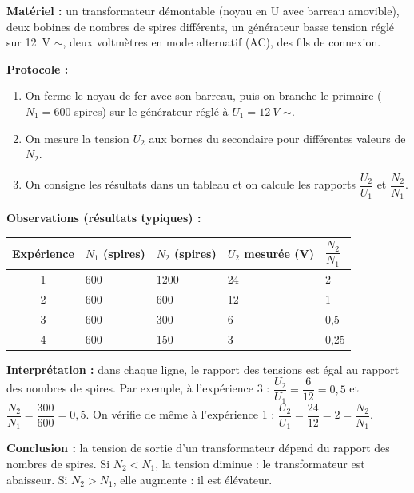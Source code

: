 \documentclass[11pt]{article}
\newcommand{\cle}[1]{{\popxbold\color{popdark}#1}}
\begin{document}
\begin{experience}
\textbf{Matériel :} un transformateur démontable (noyau en U avec barreau amovible), deux bobines de nombres de spires différents, un générateur basse tension réglé sur \SI{12}{V} $\sim$, deux voltmètres en mode alternatif (AC), des fils de connexion.

\textbf{Protocole :}
\begin{enumerate}
\item On ferme le noyau de fer avec son barreau, puis on branche le primaire ($N_1 = 600$ spires) sur le générateur réglé à $U_1 = \SI{12}{V}$ $\sim$.
\item On mesure la tension $U_2$ aux bornes du secondaire pour différentes valeurs de $N_2$.
\item On consigne les résultats dans un tableau et on calcule les rapports $\dfrac{U_2}{U_1}$ et $\dfrac{N_2}{N_1}$.
\end{enumerate}

\textbf{Observations (résultats typiques) :}

\begin{center}
\begin{tabularx}{\linewidth}{|c|X|X|X|X|}
\hline
\rowcolor{popblueL} Expérience & $N_1$ (spires) & $N_2$ (spires) & $U_2$ mesurée (V) & $\dfrac{N_2}{N_1}$ \\
\hline
1 & 600 & 1200 & 24 & 2 \\
\hline
2 & 600 & 600 & 12 & 1 \\
\hline
3 & 600 & 300 & 6 & 0,5 \\
\hline
4 & 600 & 150 & 3 & 0,25 \\
\hline
\end{tabularx}
\end{center}

\textbf{Interprétation :} dans chaque ligne, le rapport des tensions est égal au rapport des nombres de spires. Par exemple, à l'expérience 3 : $\dfrac{U_2}{U_1} = \dfrac{6}{12} = 0,5$ et $\dfrac{N_2}{N_1} = \dfrac{300}{600} = 0,5$. On vérifie de même à l'expérience 1 : $\dfrac{U_2}{U_1} = \dfrac{24}{12} = 2 = \dfrac{N_2}{N_1}$.

\textbf{Conclusion :} la tension de sortie d'un transformateur dépend du rapport des nombres de spires. Si $N_2 < N_1$, la tension diminue : le transformateur est \cle{abaisseur}. Si $N_2 > N_1$, elle augmente : il est \cle{élévateur}.
\end{experience}
\end{document}
